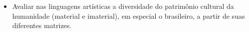 

\begin{itemize}
\item Avaliar nas linguagens artísticas a diversidade do patrimônio cultural
da humanidade (material e imaterial), em especial o brasileiro, a partir
de suas diferentes matrizes.
\end{itemize}

